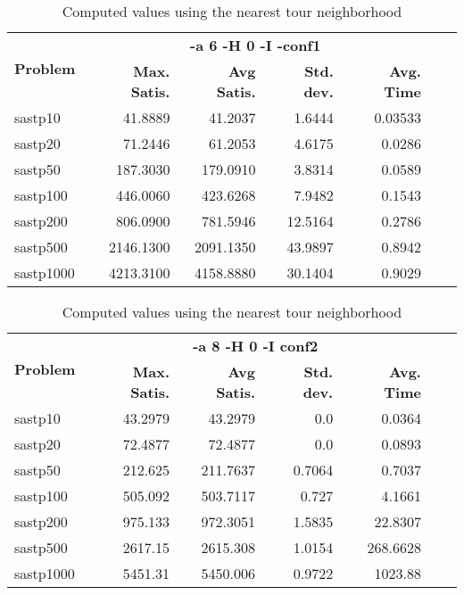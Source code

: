 \documentclass{article}
\begin{document}
\begin{table}[b!]
  \vspace{-6mm}%
  \caption{Computed values using the nearest tour neighborhood}
  \label{tab:NearestTour}
  \setlength{\tabcolsep}{1.4mm}
  \centering
  \begin{tabular}{lrrrrrr}
   \multirow{2}{*}{\bfseries Problem} &
      \multicolumn{4}{c}{\bfseries -a 6 -H 0 -I -conf1 } \\
    &
    \bfseries Max. Satis. &
    \bfseries Avg Satis. &
    \bfseries Std. dev. &
    \bfseries Avg. Time 
    \\\hline
    sastp10 & 41.8889 & 41.2037 & 1.6444 & 0.03533 \\ 
	sastp20 & 71.2446 & 61.2053 & 4.6175 & 0.0286 \\ 
	sastp50 & 187.3030 & 179.0910 & 3.8314 & 0.0589 \\ 
	sastp100 & 446.0060 & 423.6268 & 7.9482 & 0.1543 \\ 
	sastp200 & 806.0900 & 781.5946 & 12.5164 & 0.2786 \\ 
	sastp500 & 2146.1300 & 2091.1350 & 43.9897 & 0.8942 \\ 
	sastp1000 & 4213.3100 & 4158.8880 & 30.1404 & 0.9029 

    \\\hline
  \end{tabular}

\end{table}


\begin{table}[b!]
  \vspace{-6mm}%
  \caption{Computed values using the nearest tour neighborhood}
  \label{tab:NearestTour}
  \setlength{\tabcolsep}{1.4mm}
  \centering
  \begin{tabular}{lrrrrrr}
   \multirow{2}{*}{\bfseries Problem} &
      \multicolumn{4}{c}{\bfseries -a 8 -H 0 -I  conf2} \\
    &
    \bfseries Max. Satis. &
    \bfseries Avg Satis. &
    \bfseries Std. dev. &
    \bfseries Avg. Time 
    \\\hline
   sastp10 & 43.2979 & 43.2979 & 0.0 & 0.0364 \\ 
sastp20 & 72.4877 & 72.4877 & 0.0 & 0.0893 \\ 
sastp50 & 212.625 & 211.7637 & 0.7064 & 0.7037 \\ 
sastp100 & 505.092 & 503.7117 & 0.727 & 4.1661 \\ 
sastp200 & 975.133 & 972.3051 & 1.5835 & 22.8307 \\ 
sastp500 & 2617.15 & 2615.308 & 1.0154 & 268.6628 \\ 
sastp1000 & 5451.31 & 5450.006 & 0.9722 & 1023.88
    \\\hline
  \end{tabular}

\end{table}
\end{document}
